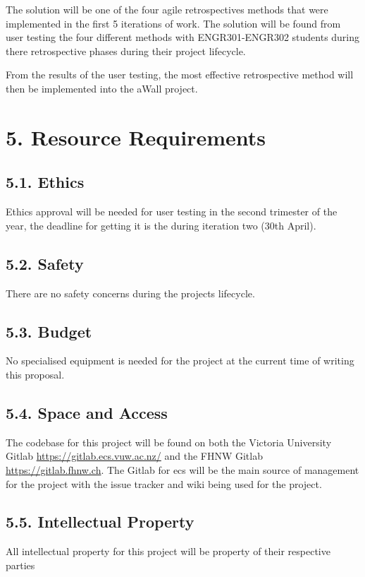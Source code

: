 \documentclass[11pt, a4paper, twoside, openright]{report}
\begin{document}
The solution will be one of the four agile retrospectives methods that were implemented in the first 5 iterations of work. The solution will be found from user testing the four different methods with ENGR301-ENGR302 students during there retrospective phases during their project lifecycle. 

From the results of the user testing, the most effective retrospective method will then be implemented into the aWall project.


\section*{5. Resource Requirements}

\subsection*{5.1. Ethics}

Ethics approval will be needed for user testing in the second trimester of the year, the deadline for getting it is the during iteration two (30th April). 

\subsection*{5.2. Safety}

There are no safety concerns during the projects lifecycle.

\subsection*{5.3. Budget}

No specialised equipment is needed for the project at the current time of writing this proposal. 

\subsection*{5.4. Space and Access}

The codebase for this project will be found on both the Victoria University Gitlab \url{https://gitlab.ecs.vuw.ac.nz/} and the FHNW Gitlab \url{https://gitlab.fhnw.ch}. The Gitlab for ecs will be the main source of management for the project with the issue tracker and wiki being used for the project.

\subsection*{5.5. Intellectual Property}

All intellectual property for this project will be property of their respective parties


% 
% 
\end{document}
